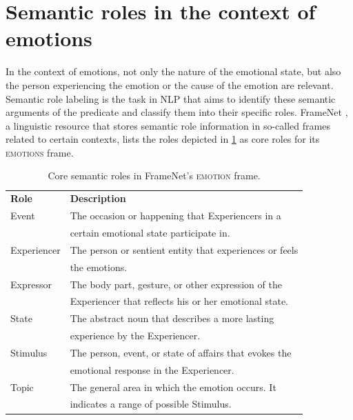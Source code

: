 \section{Semantic roles in the context of emotions}

In the context of emotions, not only the nature of the emotional state, but also the person experiencing the emotion or the cause of the emotion are relevant. Semantic role labeling is the task in NLP that aims to identify these semantic arguments of the predicate and classify them into their specific roles. FrameNet \cite{framenet}, a linguistic resource that stores semantic role information in so-called frames related to certain contexts, lists the roles depicted in \ref{tab:core-roles-framenet} as core roles for its \textsc{emotions} frame.

\begin{table}[]
\centering
\begin{tabular}{ll}
{\bf Role}  & {\bf Description}                                                                                        \\
Event       & The occasion or happening that Experiencers in a\\
            & certain emotional state participate in.\\
Experiencer & The person or sentient entity that experiences or feels\\
            & the emotions.                                     \\
Expressor   & The body part, gesture, or other expression of the \\
            & Experiencer that reflects his or her emotional state. \\
State       & The abstract noun that describes a more lasting\\
            & experience by the Experiencer.                           \\
Stimulus    & The person, event, or state of affairs that evokes the\\
            & emotional response in the Experiencer.            \\
Topic       & The general area in which the emotion occurs. It\\
            & indicates a range of possible Stimulus.                
\end{tabular}
\caption{Core semantic roles in FrameNet's \textsc{emotion} frame.}
\label{tab:core-roles-framenet}
\end{table}

